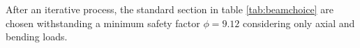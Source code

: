	After an iterative process, the standard section in table \ref{tab:beamchoice} are chosen withstanding a minimum safety factor $\phi = 9.12$ considering only axial and bending loads.
	
	
	
	
	
	
	
	
	
	
	
	
	
	
	
	
	
	
	
	
	
	
	
	
	
	
	
	
	
	
	
	
	
	
	